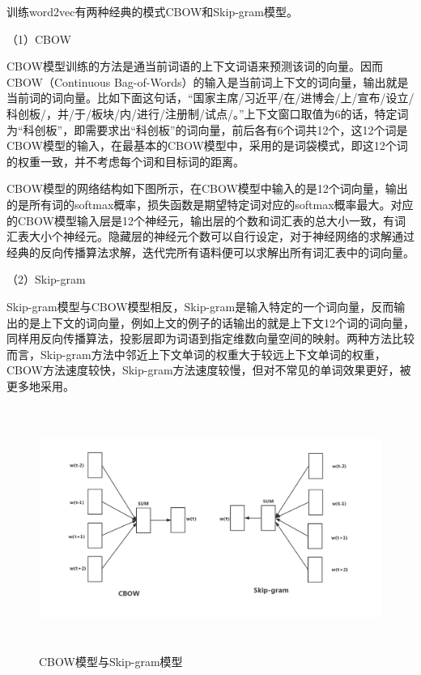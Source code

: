 \documentclass[winfonts,master,oneside,nobackinfo]{njuthesis}
\begin{document}
训练word2vec有两种经典的模式CBOW和Skip-gram模型。

（1）CBOW

CBOW模型训练的方法是通当前词语的上下文词语来预测该词的向量。因而CBOW（Continuous Bag-of-Words）的输入是当前词上下文的词向量，输出就是当前词的词向量。比如下面这句话，“国家主席/习近平/在/进博会/上/宣布/设立/科创板/，并/于/板块/内/进行/注册制/试点/。”上下文窗口取值为6的话，特定词为“科创板”，即需要求出“科创板”的词向量，前后各有6个词共12个，这12个词是CBOW模型的输入，在最基本的CBOW模型中，采用的是词袋模式，即这12个词的权重一致，并不考虑每个词和目标词的距离。

CBOW模型的网络结构如下图所示，在CBOW模型中输入的是12个词向量，输出的是所有词的softmax概率，损失函数是期望特定词对应的softmax概率最大。对应的CBOW模型输入层是12个神经元，输出层的个数和词汇表的总大小一致，有词汇表大小个神经元。隐藏层的神经元个数可以自行设定，对于神经网络的求解通过经典的反向传播算法求解，迭代完所有语料便可以求解出所有词汇表中的词向量。

（2）Skip-gram

Skip-gram模型与CBOW模型相反，Skip-gram是输入特定的一个词向量，反而输出的是上下文的词向量，例如上文的例子的话输出的就是上下文12个词的词向量，同样用反向传播算法，投影层即为词语到指定维数向量空间的映射。两种方法比较而言，Skip-gram方法中邻近上下文单词的权重大于较远上下文单词的权重\cite{Mikolov1}，CBOW方法速度较快，Skip-gram方法速度较慢，但对不常见的单词效果更好，被更多地采用。

\begin{figure}[H]
\centering
\begin{minipage}[t]{1\textwidth}
\includegraphics[width=	1\textwidth,height=8.0cm]{./figure/CBOW模型.jpg}
\caption{CBOW模型与Skip-gram模型}
\label{lab:1}
\end{minipage}
\end{figure}
\end{document}
